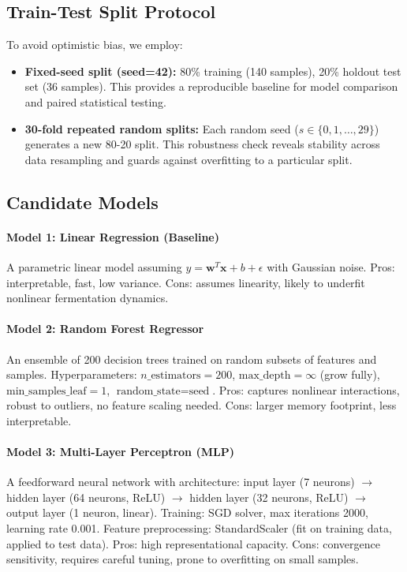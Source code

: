 \documentclass[conference]{IEEEtran}
\begin{document}
\subsection{Train-Test Split Protocol}
To avoid optimistic bias, we employ:
\begin{itemize}
\item \textbf{Fixed-seed split (seed=42):} 80\% training (140 samples), 20\% holdout test set (36 samples). This provides a reproducible baseline for model comparison and paired statistical testing.
\item \textbf{30-fold repeated random splits:} Each random seed ($s \in \{0, 1, \ldots, 29\}$) generates a new 80-20 split. This robustness check reveals stability across data resampling and guards against overfitting to a particular split.
\end{itemize}

\subsection{Candidate Models}

\paragraph{Model 1: Linear Regression (Baseline)}
A parametric linear model assuming $y = \mathbf{w}^T \mathbf{x} + b + \epsilon$ with Gaussian noise. Pros: interpretable, fast, low variance. Cons: assumes linearity, likely to underfit nonlinear fermentation dynamics.

\paragraph{Model 2: Random Forest Regressor}
An ensemble of 200 decision trees trained on random subsets of features and samples. Hyperparameters: $n\_\text{estimators}=200$, $\text{max\_depth}=\infty$ (grow fully), $\text{min\_samples\_leaf}=1$, $\text{random\_state}=\text{seed}$. Pros: captures nonlinear interactions, robust to outliers, no feature scaling needed. Cons: larger memory footprint, less interpretable.

\paragraph{Model 3: Multi-Layer Perceptron (MLP)}
A feedforward neural network with architecture: input layer (7 neurons) $\to$ hidden layer (64 neurons, ReLU) $\to$ hidden layer (32 neurons, ReLU) $\to$ output layer (1 neuron, linear). Training: SGD solver, max iterations 2000, learning rate 0.001. Feature preprocessing: StandardScaler (fit on training data, applied to test data). Pros: high representational capacity. Cons: convergence sensitivity, requires careful tuning, prone to overfitting on small samples.
\end{document}

